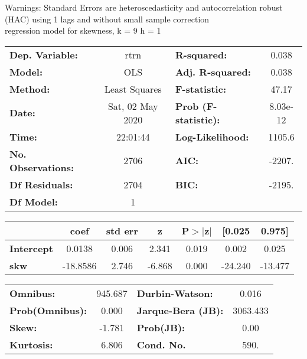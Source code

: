 Warnings: \newline
 [1] Standard Errors are heteroscedasticity and autocorrelation robust (HAC) using 1 lags and without small sample correction\\ 

regression model for skewness, k = 9 h = 1\begin{center}
\begin{tabular}{lclc}
\toprule
\textbf{Dep. Variable:}    &       rtrn       & \textbf{  R-squared:         } &     0.038   \\
\textbf{Model:}            &       OLS        & \textbf{  Adj. R-squared:    } &     0.038   \\
\textbf{Method:}           &  Least Squares   & \textbf{  F-statistic:       } &     47.17   \\
\textbf{Date:}             & Sat, 02 May 2020 & \textbf{  Prob (F-statistic):} &  8.03e-12   \\
\textbf{Time:}             &     22:01:44     & \textbf{  Log-Likelihood:    } &    1105.6   \\
\textbf{No. Observations:} &        2706      & \textbf{  AIC:               } &    -2207.   \\
\textbf{Df Residuals:}     &        2704      & \textbf{  BIC:               } &    -2195.   \\
\textbf{Df Model:}         &           1      & \textbf{                     } &             \\
\bottomrule
\end{tabular}
\begin{tabular}{lcccccc}
                   & \textbf{coef} & \textbf{std err} & \textbf{z} & \textbf{P$> |$z$|$} & \textbf{[0.025} & \textbf{0.975]}  \\
\midrule
\textbf{Intercept} &       0.0138  &        0.006     &     2.341  &         0.019        &        0.002    &        0.025     \\
\textbf{skw}       &     -18.8586  &        2.746     &    -6.868  &         0.000        &      -24.240    &      -13.477     \\
\bottomrule
\end{tabular}
\begin{tabular}{lclc}
\textbf{Omnibus:}       & 945.687 & \textbf{  Durbin-Watson:     } &    0.016  \\
\textbf{Prob(Omnibus):} &   0.000 & \textbf{  Jarque-Bera (JB):  } & 3063.433  \\
\textbf{Skew:}          &  -1.781 & \textbf{  Prob(JB):          } &     0.00  \\
\textbf{Kurtosis:}      &   6.806 & \textbf{  Cond. No.          } &     590.  \\
\bottomrule
\end{tabular}
\end{center}


